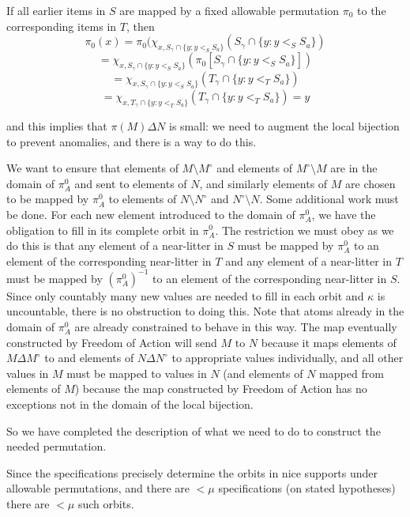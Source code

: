 \documentclass[112pt]{article}
\begin{document}
\begin{description}
If all earlier items in $S$ are mapped by a fixed allowable permutation $\pi_0$ to the corresponding items in $T$, then
$$\pi_0(x) = \pi_0(\chi_{x,S_{\gamma}\cap \{y:y <_S S_a\}}(S_{\gamma}\cap \{y:y <_S S_a\}) $$ $$ = \chi_{x,S_{\gamma}\cap \{y:y <_S S_a\}}(\pi_0[S_{\gamma}\cap \{y:y <_S S_a\}])$$ $$ = \chi_{x,S_{\gamma}\cap \{y:y <_S S_a\}}(T_{\gamma}\cap \{y:y <_T S_a\}) $$ $$= \chi_{x,T_{\gamma}\cap \{y:y <_T S_a\}}(T_{\gamma}\cap \{y:y <_T S_a\})=y$$

and this implies that $\pi(M) \Delta N$ is small:  we need to augment the local bijection to prevent anomalies, and there is a way to do this.

We want to ensure that elements of $M \setminus M^{\circ}$ and elements of $M^{\circ} \setminus M$ are in the domain of $\pi^0_A$ and sent to elements of $N$, and similarly elements of $M$ are chosen to be mapped by $\pi^0_A$ to elements of $N\setminus N^\circ$ and $N^\circ \setminus N$.
 Some additional work must be done.  For each new element introduced to the domain of $\pi^0_A$, we have the obligation to fill in its complete orbit in $\pi^0_A$.   The restriction we must obey as we do this is that any element of a near-litter in $S$ must be mapped by $\pi^0_A$ to an element of the corresponding near-litter in $T$ and any element of a near-litter in $T$  must be mapped by $(\pi^0_A)^{-1}$ to an element of the corresponding near-litter in $S$.  Since only countably many new values are needed to fill in each orbit and $\kappa$ is uncountable, there is no obstruction to doing this.  Note that atoms already in the domain of $\pi^0_A$ are already constrained to behave in this way.  The map eventually constructed by Freedom of Action will send
$M$ to $N$ because it maps elements of $M \Delta M^\circ$ to and elements of $N \Delta N^{\circ}$ to appropriate values individually, and all other values in $M$ must be mapped to values in $N$ (and elements of $N$ mapped from elements of $M$) because the map constructed by Freedom of Action has no exceptions not in the domain of the local bijection.

So we have completed the description of what we need to do to construct the needed permutation.

\end{description}

Since the specifications precisely determine the orbits in nice supports under allowable permutations, and there are $<\mu$ specifications
(on stated hypotheses) there are $<\mu$ such orbits.
\end{document}
